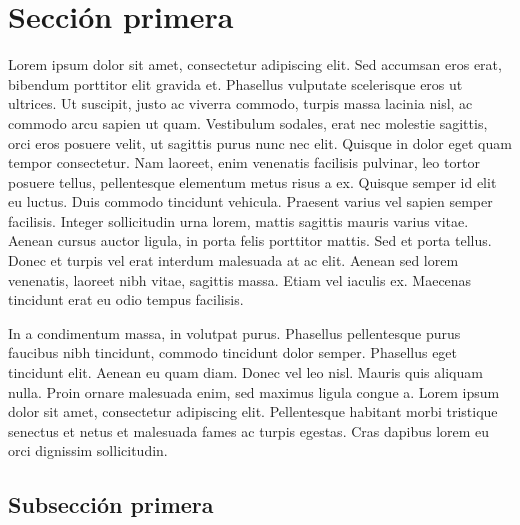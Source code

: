 \documentclass[a4paper, twoside]{article}
\newcommand{\rutapaquetes}{./paquetes-apunte}
\begin{document}
\maketitle %

\tableofcontents %



\section{Sección primera}

Lorem ipsum dolor sit amet, consectetur adipiscing elit. Sed accumsan eros erat, bibendum porttitor elit gravida et. Phasellus vulputate scelerisque eros ut ultrices. Ut suscipit, justo ac viverra commodo, turpis massa lacinia nisl, ac commodo arcu sapien ut quam. Vestibulum sodales, erat nec molestie sagittis, orci eros posuere velit, ut sagittis purus nunc nec elit. Quisque in dolor eget quam tempor consectetur. Nam laoreet, enim venenatis facilisis pulvinar, leo tortor posuere tellus, pellentesque elementum metus risus a ex. Quisque semper id elit eu luctus. Duis commodo tincidunt vehicula. Praesent varius vel sapien semper facilisis. Integer sollicitudin urna lorem, mattis sagittis mauris varius vitae. Aenean cursus auctor ligula, in porta felis porttitor mattis. Sed et porta tellus. Donec et turpis vel erat interdum malesuada at ac elit. Aenean sed lorem venenatis, laoreet nibh vitae, sagittis massa. Etiam vel iaculis ex. Maecenas tincidunt erat eu odio tempus facilisis.

In a condimentum massa, in volutpat purus. Phasellus pellentesque purus faucibus nibh tincidunt, commodo tincidunt dolor semper. Phasellus eget tincidunt elit. Aenean eu quam diam. Donec vel leo nisl. Mauris quis aliquam nulla. Proin ornare malesuada enim, sed maximus ligula congue a. Lorem ipsum dolor sit amet, consectetur adipiscing elit. Pellentesque habitant morbi tristique senectus et netus et malesuada fames ac turpis egestas. Cras dapibus lorem eu orci dignissim sollicitudin. 

\subsection{Subsección primera}
\end{document}
